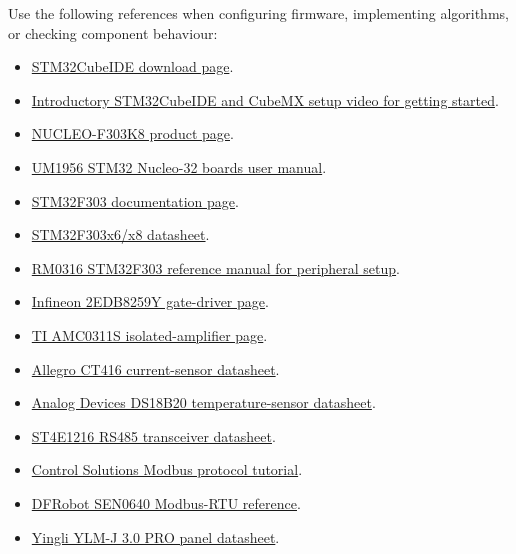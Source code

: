 \documentclass[11pt,a4paper]{article}
\begin{document}
Use the following references when configuring firmware, implementing algorithms, or checking component behaviour:
\begin{itemize}
  \item \href{https://www.st.com/en/development-tools/stm32cubeide}{STM32CubeIDE download page}.
  \item \href{https://www.youtube.com/watch?v=FAb4DnOZ9LA}{Introductory STM32CubeIDE and CubeMX setup video for getting started}.
  \item \href{https://www.st.com/en/evaluation-tools/nucleo-f303k8.html}{NUCLEO-F303K8 product page}.
  \item \href{https://www.st.com/resource/en/user_manual/um1956-stm32-nucleo32-boards-mb1180-stmicroelectronics.pdf}{UM1956 STM32 Nucleo-32 boards user manual}.
  \item \href{https://www.st.com/en/microcontrollers-microprocessors/stm32f303/documentation.html}{STM32F303 documentation page}.
  \item \href{https://www.st.com/resource/en/datasheet/stm32f303c6.pdf}{STM32F303x6/x8 datasheet}.
  \item \href{https://www.st.com/resource/en/reference_manual/rm0316-stm32f303xbcde-stm32f303x68-stm32f328x8-stm32f358xc-stm32f398xe-advanced-armbased-mcus-stmicroelectronics.pdf}{RM0316 STM32F303 reference manual for peripheral setup}.
  \item \href{https://www.infineon.com/part/2EDB8259Y}{Infineon 2EDB8259Y gate-driver page}.
  \item \href{https://www.ti.com/product/AMC0311S}{TI AMC0311S isolated-amplifier page}.
  \item \href{https://www.allegromicro.com/~/media/files/datasheets/CT416-datasheet.pdf}{Allegro CT416 current-sensor datasheet}.
  \item \href{https://www.analog.com/media/en/technical-documentation/data-sheets/ds18b20.pdf}{Analog Devices DS18B20 temperature-sensor datasheet}.
  \item \href{https://www.st.com/resource/en/datasheet/st4e1216.pdf}{ST4E1216 RS485 transceiver datasheet}.
  \item \href{https://www.csimn.com/CSI_pages/Modbus101.html}{Control Solutions Modbus protocol tutorial}.
  \item \href{https://wiki.dfrobot.com/sen0640/docs/20430}{DFRobot SEN0640 Modbus-RTU reference}.
  \item \href{https://www.offgridtec.com/media/product_attachements/YingliSolar_410W\%20YLM-J\%203.0\%20PRO_Datasheet.pdf}{Yingli YLM-J 3.0 PRO panel datasheet}.
\end{itemize}
\end{document}
